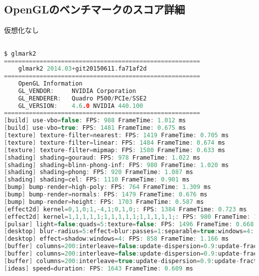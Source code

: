 \documentclass[onecolumn]{preport}
\begin{document}
\subsection{OpenGLのベンチマークのスコア詳細}
仮想化なし
\begin{lstlisting}[language=c]

$ glmark2
=======================================================
    glmark2 2014.03+git20150611.fa71af2d
=======================================================
    OpenGL Information
    GL_VENDOR:     NVIDIA Corporation
    GL_RENDERER:   Quadro P500/PCIe/SSE2
    GL_VERSION:    4.6.0 NVIDIA 440.100
=======================================================
[build] use-vbo=false: FPS: 988 FrameTime: 1.012 ms
[build] use-vbo=true: FPS: 1481 FrameTime: 0.675 ms
[texture] texture-filter=nearest: FPS: 1419 FrameTime: 0.705 ms
[texture] texture-filter=linear: FPS: 1484 FrameTime: 0.674 ms
[texture] texture-filter=mipmap: FPS: 1580 FrameTime: 0.633 ms
[shading] shading=gouraud: FPS: 978 FrameTime: 1.022 ms
[shading] shading=blinn-phong-inf: FPS: 980 FrameTime: 1.020 ms
[shading] shading=phong: FPS: 920 FrameTime: 1.087 ms
[shading] shading=cel: FPS: 1110 FrameTime: 0.901 ms
[bump] bump-render=high-poly: FPS: 764 FrameTime: 1.309 ms
[bump] bump-render=normals: FPS: 1479 FrameTime: 0.676 ms
[bump] bump-render=height: FPS: 1703 FrameTime: 0.587 ms
[effect2d] kernel=0,1,0;1,-4,1;0,1,0;: FPS: 1384 FrameTime: 0.723 ms
[effect2d] kernel=1,1,1,1,1;1,1,1,1,1;1,1,1,1,1;: FPS: 980 FrameTime: 1.020 ms
[pulsar] light=false:quads=5:texture=false: FPS: 1496 FrameTime: 0.668 ms
[desktop] blur-radius=5:effect=blur:passes=1:separable=true:windows=4: FPS: 695 FrameTime: 1.439 ms
[desktop] effect=shadow:windows=4: FPS: 858 FrameTime: 1.166 ms
[buffer] columns=200:interleave=false:update-dispersion=0.9:update-fraction=0.5:update-method=map: FPS: 425 FrameTime: 2.353 ms
[buffer] columns=200:interleave=false:update-dispersion=0.9:update-fraction=0.5:update-method=subdata: FPS: 627 FrameTime: 1.595 ms
[buffer] columns=200:interleave=true:update-dispersion=0.9:update-fraction=0.5:update-method=map: FPS: 570 FrameTime: 1.754 ms
[ideas] speed=duration: FPS: 1643 FrameTime: 0.609 ms

\end{lstlisting}
\end{document}
